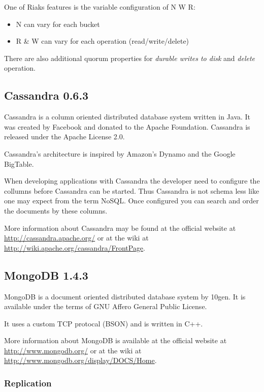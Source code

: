 One of Riaks features is the variable configuration of N W R:

\begin{itemize}
\item
  N can vary for each bucket
\item
  R \& W can vary for each operation (read/write/delete)
\end{itemize}
There are also additional quorum properties for 
\emph{durable writes to disk} and \emph{delete} operation.


\subsection{Cassandra 0.6.3}

Cassandra is a column oriented distributed database system written
in Java. It was created by Facebook and donated to the Apache
Foundation. Cassandra is released under the Apache License 2.0.

Cassandra's architecture is inspired by Amazon's Dynamo and the
Google BigTable.

When developing applications with Cassandra the developer need to
configure the collumns before Cassandra can be started. Thus
Cassandra is not schema less like one may expect from the term
NoSQL. Once configured you can search and order the documents by
these columns.

More information about Cassandra may be found at the official
website at \url{http://cassandra.apache.org/} or at the wiki at
\url{http://wiki.apache.org/cassandra/FrontPage}.

\subsection{MongoDB 1.4.3}

MongoDB is a document oriented distributed database system by
10gen. It is available under the terms of GNU Affero General Public
License.

It uses a custom TCP protocal (BSON) and is written in C++.

More information about MongoDB is available at the official website
at \url{http://www.mongodb.org/} or at the wiki at
\url{http://www.mongodb.org/display/DOCS/Home}.

\subsubsection{Replication}

